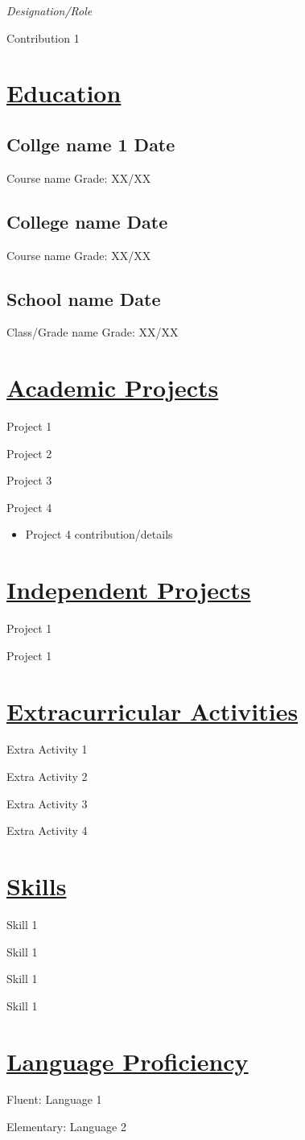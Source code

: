 \documentclass[a4paper,11pt]{article}
\newcommand{\longunderline}[1]{\uline{#1\hfill\mbox{}}}
\begin{document}
	\emph{Designation/Role}

	Contribution 1

\section*{\longunderline{Education}}

	\subsection*{Collge name 1 \hfill Date}
		Course name  \hfill 					Grade: XX/XX
	
	\subsection*{College name \hfill Date}
		Course name \hfill Grade: XX/XX

	\subsection*{School name \hfill Date}
		Class/Grade name \hfill Grade: XX/XX
\section*{\longunderline{Academic Projects}}

	Project 1

	Project 2

	Project 3

	Project 4
	\begin{itemize}[noitemsep,topsep=0pt]
		\item Project 4 contribution/details
	\end{itemize}

\section*{\longunderline{Independent Projects}}

	Project 1

	Project 1

\section*{\longunderline{Extracurricular Activities}}

	Extra Activity 1

	Extra Activity 2

	Extra Activity 3
	
	Extra Activity 4

\section*{\longunderline{Skills}}

	Skill 1

	Skill 1

	Skill 1

	Skill 1

\section*{\longunderline{Language Proficiency}}
	
	Fluent: Language 1

	Elementary: Language 2
\end{document}

